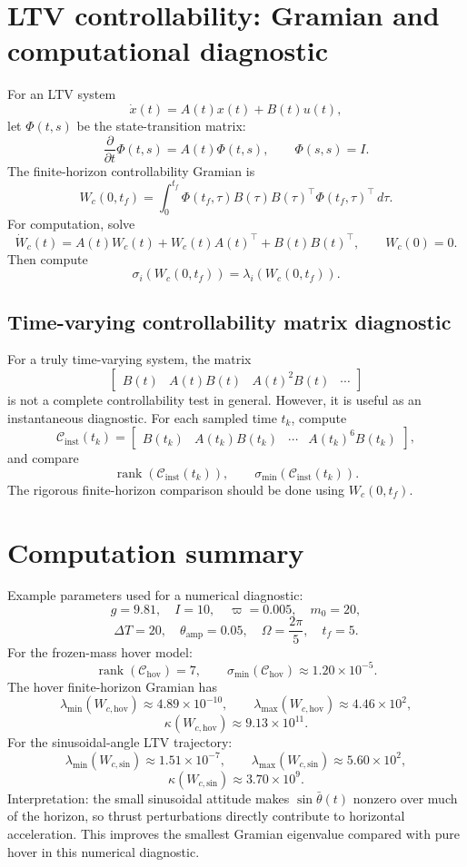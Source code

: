 \documentclass[10pt]{article}
\newcommand{\thb}{\bar\theta}
\newcommand{\vphi}{\varpi}
\begin{document}
\section{LTV controllability: Gramian and computational diagnostic}
For an LTV system
\[
    \dot x(t)=A(t)x(t)+B(t)u(t),
\]
let $\Phi(t,s)$ be the state-transition matrix:
\[
    \frac{\partial}{\partial t}\Phi(t,s)=A(t)\Phi(t,s),
    \qquad
    \Phi(s,s)=I.
\]
The finite-horizon controllability Gramian is
\[
    \boxed{W_c(0,t_f)=\int_0^{t_f}\Phi(t_f,\tau)B(\tau)B(\tau)^{\top}\Phi(t_f,\tau)^{\top}\,d\tau.}
\]
For computation, solve
\[
    \boxed{\dot W_c(t)=A(t)W_c(t)+W_c(t)A(t)^{\top}+B(t)B(t)^{\top},\qquad W_c(0)=0.}
\]
Then compute
\[
    \boxed{\sigma_i(W_c(0,t_f))=\lambda_i(W_c(0,t_f))}.
\]

\subsection*{Time-varying controllability matrix diagnostic}
For a truly time-varying system, the matrix
\[
    \begin{bmatrix}B(t)&A(t)B(t)&A(t)^2B(t)&\cdots\end{bmatrix}
\]
is not a complete controllability test in general. However, it is useful as an instantaneous diagnostic. For each sampled time $t_k$, compute
\[
    \mathcal C_{\mathrm{inst}}(t_k)=
    \begin{bmatrix}B(t_k)&A(t_k)B(t_k)&\cdots&A(t_k)^{6}B(t_k)\end{bmatrix},
\]
and compare
\[
    \operatorname{rank}(\mathcal C_{\mathrm{inst}}(t_k)),
    \qquad
    \sigma_{\min}(\mathcal C_{\mathrm{inst}}(t_k)).
\]
The rigorous finite-horizon comparison should be done using $W_c(0,t_f)$.

\section{Computation summary}
Example parameters used for a numerical diagnostic:
\[
    g=9.81,\quad I=10,\quad \vphi=0.005,\quad m_0=20,
\]
\[
    \Delta T=20,\quad \theta_{\mathrm{amp}}=0.05,\quad \Omega=\frac{2\pi}{5},\quad t_f=5.
\]
For the frozen-mass hover model:
\[
    \operatorname{rank}(\mathcal C_{\mathrm{hov}})=7,
    \qquad
    \sigma_{\min}(\mathcal C_{\mathrm{hov}})\approx 1.20\times 10^{-5}.
\]
The hover finite-horizon Gramian has
\[
    \lambda_{\min}(W_{c,\mathrm{hov}})\approx 4.89\times 10^{-10},
    \qquad
    \lambda_{\max}(W_{c,\mathrm{hov}})\approx 4.46\times 10^2,
\]
\[
    \kappa(W_{c,\mathrm{hov}})\approx 9.13\times 10^{11}.
\]
For the sinusoidal-angle LTV trajectory:
\[
    \lambda_{\min}(W_{c,\mathrm{sin}})\approx 1.51\times 10^{-7},
    \qquad
    \lambda_{\max}(W_{c,\mathrm{sin}})\approx 5.60\times 10^2,
\]
\[
    \kappa(W_{c,\mathrm{sin}})\approx 3.70\times 10^9.
\]
Interpretation: the small sinusoidal attitude makes $\sin\thb(t)$ nonzero over much of the horizon, so thrust perturbations directly contribute to horizontal acceleration. This improves the smallest Gramian eigenvalue compared with pure hover in this numerical diagnostic.
\end{document}
